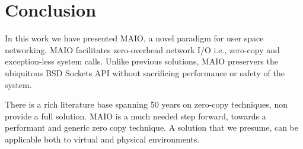 \documentclass[sigconf,9pt]{acmart}
\newcommand{\oursys}{MAIO\xspace}
\newcommand{\sockets}{BSD Sockets\xspace}
\begin{document}

\section{Conclusion}
In this work we have presented \oursys, a novel paradigm for user space networking. \oursys facilitates zero-overhead network I/O i.e., zero-copy and exception-less system calls. Unlike previous solutions, \oursys preservers the ubiquitous \sockets API without sacrificing performance or safety of the system.


There is a rich literature base spanning 50 years on zero-copy techniques, non provide a full solution\cite{song2012performance}. \oursys is a much needed step forward, towards a performant and generic zero copy technique. A solution that we presume, can be applicable both to virtual and physical environments.



\end{document}
